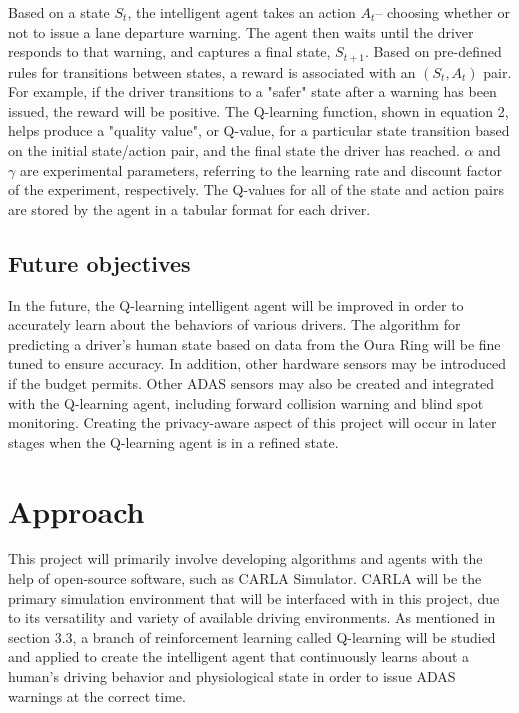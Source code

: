 \documentclass[12pt]{article}
\renewcommand{\_}{\kern-1.5pt\textunderscore\kern-1.5pt}
\begin{document}
Based on a state $S_{t}$, the intelligent agent takes an action $A_{t}$-- choosing whether or not to issue a lane departure warning. The agent then waits until the driver responds to that warning, and captures a final state, $S_{t+1}$. Based on pre-defined rules for transitions between states, a reward is associated with an $(S_{t}, A_{t})$ pair. For example, if the driver transitions to a "safer" state after a warning has been issued, the reward will be positive. The Q-learning function, shown in equation 2, helps produce a "quality value", or Q-value, for a particular state transition based on the initial state/action pair, and the final state the driver has reached. $\alpha$ and $\gamma$ are experimental parameters, referring to the learning rate and discount factor of the experiment, respectively. The Q-values for all of the state and action pairs are stored by the agent in a tabular format for each driver. \par


\subsection{Future objectives}
In the future, the Q-learning intelligent agent will be improved in order to accurately learn about the behaviors of various drivers. The algorithm for predicting a driver's human state based on data from the Oura Ring will be fine tuned to ensure accuracy. In addition, other hardware sensors may be introduced if the budget permits. Other ADAS sensors may also be created and integrated with the Q-learning agent, including forward collision warning and blind spot monitoring. Creating the privacy-aware aspect of this project will occur in later stages when the Q-learning agent is in a refined state.

\section{Approach}
This project will primarily involve developing algorithms and agents with the help of open-source software, such as CARLA Simulator. CARLA will be the primary simulation environment that will be interfaced with in this project, due to its versatility and variety of available driving environments. As mentioned in section 3.3, a branch of reinforcement learning called Q-learning will be studied and applied to create the intelligent agent that continuously learns about a human's driving behavior and physiological state in order to issue ADAS warnings at the correct time. \par
\end{document}
